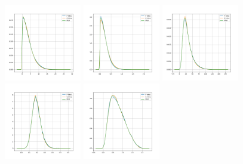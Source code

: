 \begin{figure}[!ht]
    \label{fig:realworldexperiments-scarlatti-real}
    \centering
    \includegraphics[width=0.3\textwidth]{../images/realworldexperiments/scarlatti/realdata/TrainVsTest_avgIOI.png}
    \includegraphics[width=0.3\textwidth]{../images/realworldexperiments/scarlatti/realdata/TrainVsTest_avgPitchShift.png}
    \includegraphics[width=0.3\textwidth]{../images/realworldexperiments/scarlatti/realdata/TrainVsTest_nNotesPerMeasure.png}
    \includegraphics[width=0.3\textwidth]{../images/realworldexperiments/scarlatti/realdata/TrainVsTest_noteLengthHist.png}
    \includegraphics[width=0.3\textwidth]{../images/realworldexperiments/scarlatti/realdata/TrainVsTest_noteLengthTransMatrix.png}

\end{figure}
